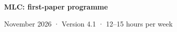 \documentclass[11pt,a4paper]{article}
\begin{document}
\begin{center}
{\LARGE\bfseries MLC: first-paper programme}\par{} November 2026 · Version 4.1 · 12--15 hours per week
\end{center}

\end{document}

